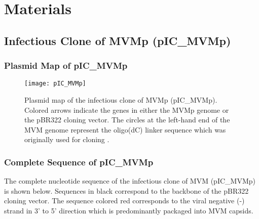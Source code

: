 
\chapter{Materials} %

\label{Materials} %


\section{Infectious Clone of MVMp (pIC\_MVMp)}
\label{IC}


\subsection{Plasmid Map of pIC\_MVMp}

\begin{figure}[h] 
\begin{center}
\texttt{[image: pIC\_MVMp]}
\caption[Plasmid Map of the Infectious Clone of MVMp]{Plasmid map of the infectious clone of MVMp (pIC\_MVMp). Colored arrows indicate the genes in either the MVMp genome or the pBR322 cloning vector. The circles at the left-hand end of the MVM genome represent the oligo(dC) linker sequence which was originally used for cloning \cite{pmid6345805}.}
\label{pIC}
\end{center}
\end{figure}

\newpage

\subsection{Complete Sequence of pIC\_MVMp}
\label{sequence}

\raggedright
The complete nucleotide sequence of the infectious clone of MVM (pIC\_MVMp) is shown below. Sequences in black correspond to the backbone of the pBR322 cloning vector. The sequence colored red corresponds to the viral negative (-) strand in 3' to 5' direction which is predominantly packaged into MVM capsids.  


